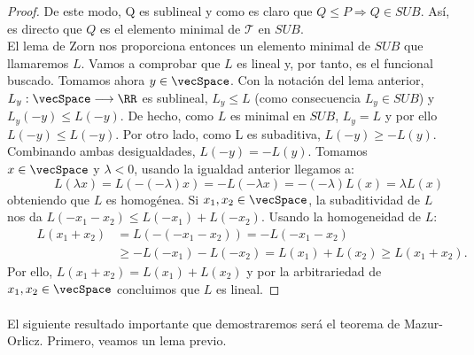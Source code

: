 \begin{proof}
		De este modo, Q es sublineal y como es claro que $ Q \leq P \Longrightarrow Q \in SUB$. Así, es directo que $ Q $ es el elemento minimal de $ \mathcal{T} $ en $SUB$.\\
		
		El lema de Zorn nos proporciona entonces un elemento minimal de $ SUB $ que llamaremos $ L $. Vamos a comprobar que $ L $ es lineal y, por tanto, es el funcional buscado. Tomamos ahora $ y \in \vecSpace $. Con la notación del lema anterior, $ L_y : \vecSpace \longrightarrow \RR $ es sublineal, $ L_y \leq L $ (como consecuencia $ L_y \in SUB $) y $ L_y (-y) \leq L(-y) $. De hecho, como $ L $ es minimal en $ SUB $, $ L_y = L $ y por ello $ L (-y) \leq L(-y) $. Por otro lado, como L es subaditiva, $ L(-y) \geq -L(y) $. Combinando ambas desigualdades, $ L(-y) = -L(y) $. Tomamos $ x \in \vecSpace $ y $ \lambda < 0 $, usando la igualdad anterior llegamos a:
		\[ \qquad \quad
		L(\lambda x) = L (-(-\lambda)x) = -L(-\lambda x) = -(-\lambda)L(x) = \lambda L(x) \label{1}
		\] 
		obteniendo que $ L $ es homogénea. Si $ x_1, x_2 \in \vecSpace $, la subaditividad de $ L $ nos da $ L(-x_1-x_2) \leq L(-x_1) + L(-x_2) $. Usando la homogeneidad de $ L $:
		\begin{equation*}
		\begin{split} \qquad
		L(x_1+x_2) &= L(-(-x_1-x_2)) = -L(-x_1-x_2) \\ 
		& \geq -L(-x_1)-L(-x_2) = L(x_1) + L (x_2) \geq L(x_1+x_2). 
		\end{split}
		\end{equation*}
		Por ello, $	L(x_1+x_2) = L(x_1) + L (x_2) $ y por la arbitrariedad de $ x_1, x_2 \in \vecSpace $ concluimos que $ L $ es lineal.
		
	\end{proof}

	\paragraph{} El siguiente resultado importante que demostraremos será el teorema de Mazur-Orlicz. Primero, veamos un lema previo.
	
